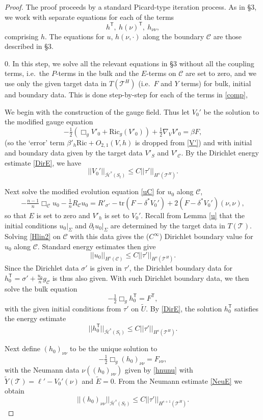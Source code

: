 \documentclass[10pt]{amsart}
\renewcommand{\b}{\beta}
\renewcommand{\d}{\delta}
\newcommand{\s}{\sigma}
\newcommand{\Si}{\Sigma}
\newcommand{\cC}{{\mathcal C}}
\newcommand{\cT}{{\mathcal T}}
\newcommand{\cH}{{\mathcal H}}
\newcommand{\Ric}{\mathrm{Ric}}
\newcommand{\tT}{\mathsf{T}}
\newcommand{\be}{\begin{equation}}
\newcommand{\ee}{\end{equation}}
\newcommand{\tr}{\mathrm{tr}}
\newcommand{\p}{\partial}
\newcommand{\<}{\langle}
\renewcommand{\>}{\rangle}
\newcommand{\w}{\widetilde}
\theoremstyle{plain}
\theoremstyle{remark}
\theoremstyle{definition}
\numberwithin{equation}{section}
\begin{document}
 \begin{proof} 

  The proof proceeds by a standard Picard-type iteration process. As in \S 3, we work with separate equations for each of the terms 
\be \label{comp}
h^{\tT}, \ h(\nu)^{\tT}, \ h_{\nu \nu},
\ee
comprising $h$. The equations for $u$, $h(\nu, \cdot)$ along the boundary $\cC$ are those described in \S 3. 

  
\medskip 


0. In this step, we solve all the relevant equations in \S 3 without all the coupling terms, i.e.~the $P$-terms in the bulk and the $E$-terms on $\cC$ are 
set to zero, and we use only the given target data in $T(\cT^H)$ (i.e.~$F$ and $Y$ terms) for bulk, initial and boundary data. This is done step-by-step 
for each of the terms in \eqref{comp}, 

  We begin with the construction of the gauge field. Thus let $V_0'$ be the solution to the modified gauge equation 
\be \label{modV'}
-\tfrac{1}{2}(\Box_g V'_0+ \Ric_g (V'_0)) + \tfrac{1}{2}\nabla_{V} V'_0 = \b F,
\ee
(so the `error' term $\b'_h \Ric + O_{2,1}(V,h)$ is dropped from \eqref{V'}) and with initial and boundary data given by the target data $V'_S$ and $V'_{\cC}$.  
By the Dirichlet energy estimate \eqref{DirE}, we have 
$$||V_0'||_{\bar \cH^s(S_t)} \leq C||\tau'||_{H^s(\cT^H)}.$$

  Next solve the modified evolution equation \eqref{uC} for $u_0$ along $\cC$, 
\be \label{Hlin2} 
-\tfrac{n-1}{n} \Box_\cC u _0 -\tfrac{1}{n}R_{\cC}u_0 = R'_{\s'} - \tr(F-\d^* V_0') + 2(F-\d^* V_0')(\nu,\nu),
\ee
so that $E$ is set to zero and $V'_h$ is set to $V_0'$. Recall from Lemma \ref{u} that the initial conditions $u_0 |_{\Si}$ and $\p_t u_0 |_{\Si}$ are determined 
by the target data in $T(\cT)$. Solving \eqref{Hlin2} on $\cC$ with this data gives the ($C^{\infty}$) Dirichlet boundary value for $u_0$ along 
$\cC$. Standard energy estimates then give 
$$||u_0||_{H^s(\cC)} \leq C||\tau'||_{H^s(\cT^H)}.$$
Since the Dirichlet data $\s'$ is given in $\tau'$, the Dirichlet boundary data for $h_0^{\tT} = \s' + \frac{u_0}{n}g_{\cC}$ is thus also given. 
With such Dirichlet boundary data, we then solve the bulk equation 
\be \label{hT0}
-\tfrac{1}{2}\Box_g h_0^{\tT}   = F^{\tT}, 
\ee
with the given initial conditions from $\tau'$ on $\w U$. By \eqref{DirE}, the solution $h_0^{\tT}$ satisfies the energy estimate 
\be \label{H0Test}
||h_0^{\tT}||_{\bar \cH^s(S_t)} \leq C||\tau'||_{H^s(\cT^H)}.
\ee


  Next define $(h_0)_{\nu\nu}$ to be the unique solution to 
$$-\tfrac{1}{2}\Box_g (h_0)_{\nu\nu} = F_{\nu \nu},$$
with the Neumann data $\nu((h_0)_{\nu \nu})$ given by \eqref{hnunu} with $\w Y(\cT) = \ell' - V_0'(\nu)$ and $\w E = 0$. 
From the Neumann estimate \eqref{NeuE} we obtain 
\be \label{0nunu}
||(h_0)_{\nu\nu}||_{\bar \cH^s(S_t)} \leq C||\tau'||_{H^{s+1}(\cT^H)}.
\ee


\end{proof}
\end{document}

